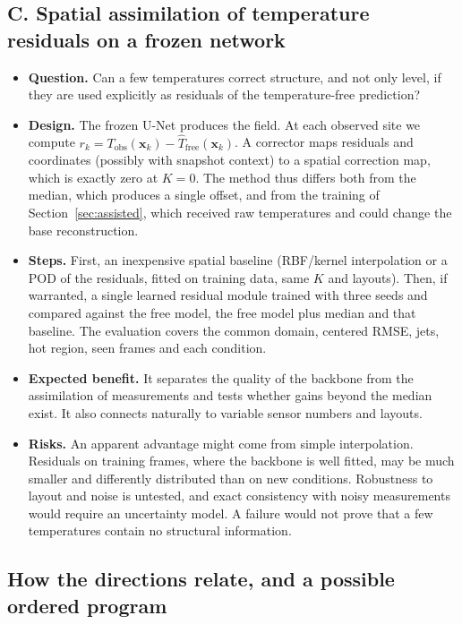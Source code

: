 \documentclass[11pt,letterpaper]{article}
\begin{document}
\subsection*{C. Spatial assimilation of temperature residuals on a frozen network}
\begin{itemize}
  \item \textbf{Question.} Can a few temperatures correct structure, and not only level, if they are used explicitly as residuals of the temperature-free prediction?
  \item \textbf{Design.} The frozen U-Net produces the field. At each observed site we compute $r_k=T_{\text{obs}}(\mathbf{x}_k)-\hat T_{\text{free}}(\mathbf{x}_k)$. A corrector maps residuals and coordinates (possibly with snapshot context) to a spatial correction map, which is exactly zero at $K{=}0$. The method thus differs both from the median, which produces a single offset, and from the training of Section~\ref{sec:assisted}, which received raw temperatures and could change the base reconstruction.
  \item \textbf{Steps.} First, an inexpensive spatial baseline (RBF/kernel interpolation or a POD of the residuals, fitted on training data, same $K$ and layouts). Then, if warranted, a single learned residual module trained with three seeds and compared against the free model, the free model plus median and that baseline. The evaluation covers the common domain, centered RMSE, jets, hot region, seen frames and each condition.
  \item \textbf{Expected benefit.} It separates the quality of the backbone from the assimilation of measurements and tests whether gains beyond the median exist. It also connects naturally to variable sensor numbers and layouts.
  \item \textbf{Risks.} An apparent advantage might come from simple interpolation. Residuals on training frames, where the backbone is well fitted, may be much smaller and differently distributed than on new conditions. Robustness to layout and noise is untested, and exact consistency with noisy measurements would require an uncertainty model. A failure would not prove that a few temperatures contain no structural information.
\end{itemize}

\subsection*{How the directions relate, and a possible ordered program}
\end{document}

